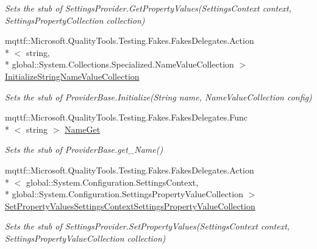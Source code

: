 \begin{DoxyCompactItemize}
\begin{DoxyCompactList}\small\item\em Sets the stub of Settings\-Provider.\-Get\-Property\-Values(\-Settings\-Context context, Settings\-Property\-Collection collection)\end{DoxyCompactList}\item 
mqttf\-::\-Microsoft.\-Quality\-Tools.\-Testing.\-Fakes.\-Fakes\-Delegates.\-Action\\*
$<$ string, \\*
global\-::\-System.\-Collections.\-Specialized.\-Name\-Value\-Collection $>$ \hyperlink{class_system_1_1_configuration_1_1_fakes_1_1_stub_settings_provider_af1b3df977745a6c5042759dcd3e55fe6}{Initialize\-String\-Name\-Value\-Collection}
\begin{DoxyCompactList}\small\item\em Sets the stub of Provider\-Base.\-Initialize(\-String name, Name\-Value\-Collection config)\end{DoxyCompactList}\item 
mqttf\-::\-Microsoft.\-Quality\-Tools.\-Testing.\-Fakes.\-Fakes\-Delegates.\-Func\\*
$<$ string $>$ \hyperlink{class_system_1_1_configuration_1_1_fakes_1_1_stub_settings_provider_a03738cfb6dc7ddb8963ffee22072881a}{Name\-Get}
\begin{DoxyCompactList}\small\item\em Sets the stub of Provider\-Base.\-get\-\_\-\-Name()\end{DoxyCompactList}\item 
mqttf\-::\-Microsoft.\-Quality\-Tools.\-Testing.\-Fakes.\-Fakes\-Delegates.\-Action\\*
$<$ global\-::\-System.\-Configuration.\-Settings\-Context, \\*
global\-::\-System.\-Configuration.\-Settings\-Property\-Value\-Collection $>$ \hyperlink{class_system_1_1_configuration_1_1_fakes_1_1_stub_settings_provider_a015dfe1ce1d385dda9f8d9d9ea202417}{Set\-Property\-Values\-Settings\-Context\-Settings\-Property\-Value\-Collection}
\begin{DoxyCompactList}\small\item\em Sets the stub of Settings\-Provider.\-Set\-Property\-Values(\-Settings\-Context context, Settings\-Property\-Value\-Collection collection)\end{DoxyCompactList}\end{DoxyCompactItemize}
